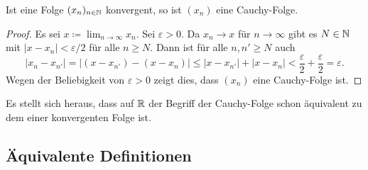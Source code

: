 \documentclass[a4paper,10pt]{article}
\begin{document}
\begin{lem}
 Ist eine Folge $(x_n)_{n \in \mathbb{N}}$ konvergent, so ist $(x_n)$ eine Cauchy-Folge.
\end{lem}
\begin{proof}
 Es sei $x \coloneqq \lim_{n \to \infty} x_n$. Sei $\varepsilon > 0$. Da $x_n \to x$ für $n \to \infty$ gibt es $N \in \mathbb{N}$ mit $|x - x_n| < \varepsilon/2$ für alle $n \geq N$. Dann ist für alle $n, n' \geq N$ auch
 \[
  |x_n - x_{n'}|
  = |(x - x_{n'}) - (x - x_n)|
  \leq |x - x_{n'}| + |x - x_n|
  < \frac{\varepsilon}{2} + \frac{\varepsilon}{2}
  = \varepsilon.
 \]
 Wegen der Beliebigkeit von $\varepsilon > 0$ zeigt dies, dass $(x_n)$ eine Cauchy-Folge ist.
\end{proof}


Es stellt sich heraus, dass auf $\mathbb{R}$ der Begriff der Cauchy-Folge schon äquivalent zu dem einer konvergenten Folge ist.



\subsection{Äquivalente Definitionen}
\end{document}
